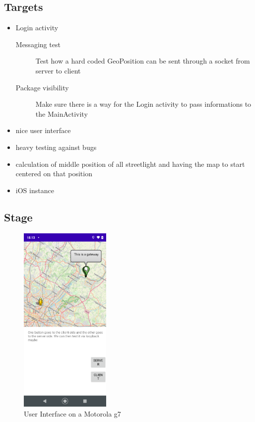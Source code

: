 \documentclass[a4paper,12pt]{book}
\begin{document}
\subsection{Targets}
%
\begin{itemize}
 \item{Login activity}
   \begin{description}
   \item[Messaging test]{Test how a hard coded GeoPosition can be sent through a socket from server to client}
   \item[Package visibility]{Make sure there is a way for the Login activity to pass informations to the MainActivity}
   \end{description}
 \item{nice user interface}
 \item{heavy testing against bugs}
 \item{calculation of middle position of all streetlight and having the map to start centered on that position}
 \item{iOS instance}
\end{itemize}

\clearpage

\subsection{Stage}

\begin{figure}
\includegraphics[width=4.4cm]{./current_status_g7.PNG}
\caption{User Interface on a Motorola g7}\label{fig:early}
\end{figure}
\end{document}
